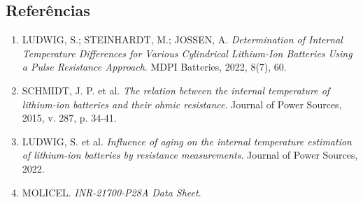 \subsection{Referências}
\begin{enumerate}
    \item LUDWIG, S.; STEINHARDT, M.; JOSSEN, A. \textit{Determination of Internal Temperature Differences for Various Cylindrical Lithium-Ion Batteries Using a Pulse Resistance Approach}. MDPI Batteries, 2022, 8(7), 60.
    \item SCHMIDT, J. P. et al. \textit{The relation between the internal temperature of lithium-ion batteries and their ohmic resistance}. Journal of Power Sources, 2015, v. 287, p. 34-41.
    \item LUDWIG, S. et al. \textit{Influence of aging on the internal temperature estimation of lithium-ion batteries by resistance measurements}. Journal of Power Sources, 2022.
    \item MOLICEL. \textit{INR-21700-P28A Data Sheet}.
\end{enumerate}
